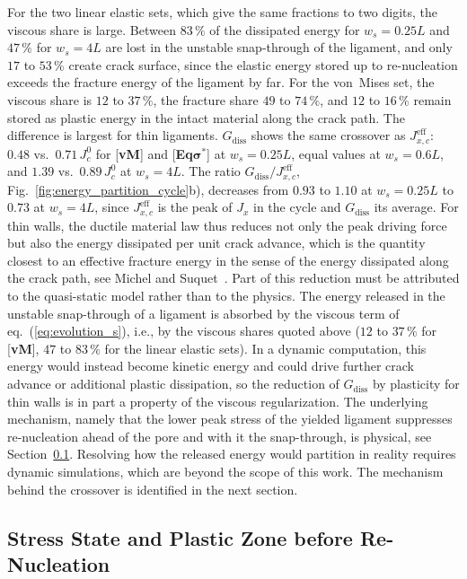 \documentclass[pdflatex,sn-mathphys-num]{sn-jnl}%
\newcommand{\vMLabel}{[\textbf{vM}]\xspace}
\newcommand{\EqSigmaStarLabel}{[\textbf{Eq$\boldsymbol{\sigma^*}$}]\xspace}
\theoremstyle{thmstyleone}%
\theoremstyle{thmstyletwo}%
\theoremstyle{thmstylethree}%
\begin{document}
For the two linear elastic sets, which give the same fractions to two digits, the viscous share is large. Between $83\,\%$ of the dissipated energy for $w_s = 0.25L$ and $47\,\%$ for $w_s = 4L$ are lost in the unstable snap-through of the ligament, and only $17$ to $53\,\%$ create crack surface, since the elastic energy stored up to re-nucleation exceeds the fracture energy of the ligament by far. For the von~Mises set, the viscous share is $12$ to $37\,\%$, the fracture share $49$ to $74\,\%$, and $12$ to $16\,\%$ remain stored as plastic energy in the intact material along the crack path. The difference is largest for thin ligaments. $G_{\text{diss}}$ shows the same crossover as $J_{x,c}^{\text{eff}}$: $0.48$ vs.\ $0.71\,J_c^0$ for \vMLabel and \EqSigmaStarLabel at $w_s = 0.25L$, equal values at $w_s = 0.6L$, and $1.39$ vs.\ $0.89\,J_c^0$ at $w_s = 4L$. The ratio $G_{\text{diss}}/J_{x,c}^{\text{eff}}$, Fig.~\ref{fig:energy_partition_cycle}b), decreases from $0.93$ to $1.10$ at $w_s = 0.25L$ to $0.73$ at $w_s = 4L$, since $J_{x,c}^{\text{eff}}$ is the peak of $J_x$ in the cycle and $G_{\text{diss}}$ its average. For thin walls, the ductile material law thus reduces not only the peak driving force but also the energy dissipated per unit crack advance, which is the quantity closest to an effective fracture energy in the sense of the energy dissipated along the crack path, see Michel and Suquet~\cite{michel_merits_2022}. Part of this reduction must be attributed to the quasi-static model rather than to the physics. The energy released in the unstable snap-through of a ligament is absorbed by the viscous term of eq.~(\ref{eq:evolution_s}), i.e., by the viscous shares quoted above ($12$ to $37\,\%$ for \vMLabel, $47$ to $83\,\%$ for the linear elastic sets). In a dynamic computation, this energy would instead become kinetic energy and could drive further crack advance or additional plastic dissipation, so the reduction of $G_{\text{diss}}$ by plasticity for thin walls is in part a property of the viscous regularization. The underlying mechanism, namely that the lower peak stress of the yielded ligament suppresses re-nucleation ahead of the pore and with it the snap-through, is physical, see Section~\ref{sec:2D_mechanisms}. Resolving how the released energy would partition in reality requires dynamic simulations, which are beyond the scope of this work. The mechanism behind the crossover is identified in the next section.

\subsection{Stress State and Plastic Zone before Re-Nucleation}
\label{sec:2D_mechanisms}
\end{document}

